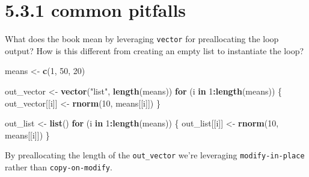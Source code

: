 \documentclass[]{book}
\newenvironment{Shaded}{\begin{snugshade}}{\end{snugshade}}
\newcommand{\ControlFlowTok}[1]{\textcolor[rgb]{0.13,0.29,0.53}{\textbf{#1}}}
\newcommand{\DecValTok}[1]{\textcolor[rgb]{0.00,0.00,0.81}{#1}}
\newcommand{\KeywordTok}[1]{\textcolor[rgb]{0.13,0.29,0.53}{\textbf{#1}}}
\newcommand{\NormalTok}[1]{#1}
\newcommand{\OperatorTok}[1]{\textcolor[rgb]{0.81,0.36,0.00}{\textbf{#1}}}
\newcommand{\StringTok}[1]{\textcolor[rgb]{0.31,0.60,0.02}{#1}}
\begin{document}
\begin{Shaded}
\end{Shaded}

\hypertarget{common-pitfalls}{%
\section*{5.3.1 common pitfalls}\label{common-pitfalls}}

What does the book mean by leveraging \texttt{vector} for preallocating the loop output? How is this different from creating an empty list to instantiate the loop?

\begin{Shaded}
\begin{Highlighting}[]
\NormalTok{means <-}\StringTok{ }\KeywordTok{c}\NormalTok{(}\DecValTok{1}\NormalTok{, }\DecValTok{50}\NormalTok{, }\DecValTok{20}\NormalTok{)}

\NormalTok{out_vector <-}\StringTok{ }\KeywordTok{vector}\NormalTok{(}\StringTok{"list"}\NormalTok{, }\KeywordTok{length}\NormalTok{(means))}
\ControlFlowTok{for}\NormalTok{ (i }\ControlFlowTok{in} \DecValTok{1}\OperatorTok{:}\KeywordTok{length}\NormalTok{(means)) \{}
\NormalTok{  out_vector[[i]] <-}\StringTok{ }\KeywordTok{rnorm}\NormalTok{(}\DecValTok{10}\NormalTok{, means[[i]])}
\NormalTok{\}}

\NormalTok{out_list <-}\StringTok{ }\KeywordTok{list}\NormalTok{()}
\ControlFlowTok{for}\NormalTok{ (i }\ControlFlowTok{in} \DecValTok{1}\OperatorTok{:}\KeywordTok{length}\NormalTok{(means)) \{}
\NormalTok{  out_list[[i]] <-}\StringTok{ }\KeywordTok{rnorm}\NormalTok{(}\DecValTok{10}\NormalTok{, means[[i]])}
\NormalTok{\}}
\end{Highlighting}
\end{Shaded}

By preallocating the length of the \texttt{out\_vector} we're leveraging \texttt{modify-in-place} rather than \texttt{copy-on-modify}.
\end{document}
